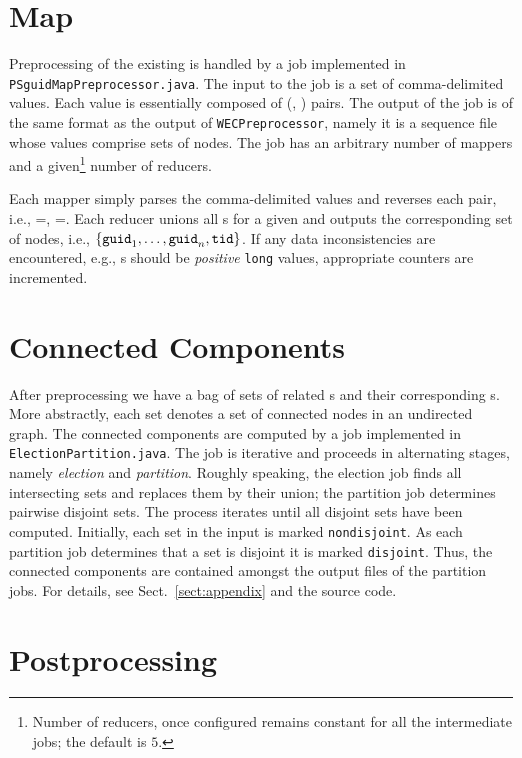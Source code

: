 \documentclass{article}[12pt]
\numberwithin{figure}{section}
\begin{document}
\section{Map}

Preprocessing of the existing {\PSGUIDMAP} is handled by a {\MAPREDUCE} job implemented in \texttt{PSguidMapPreprocessor.java}.
The input to the job is a set of comma-delimited values.  Each value is essentially composed of ({\PSGUID}, {\TID}) pairs.
The output of the job is of the same format as the output of \texttt{WECPreprocessor}, namely it is a
sequence file whose values comprise sets of nodes.
The job has an arbitrary number of mappers and a given\footnote{Number of reducers, once configured remains constant
for all the intermediate jobs; the default is $5$.} number of reducers.

Each mapper simply parses the comma-delimited values and reverses each pair, i.e., \KEY={\TID}, \VALUE={\PSGUID}.
Each reducer unions all {\PSGUID}s for a given {\TID} and outputs the corresponding set of nodes, i.e., $\{\texttt{guid}_1, \ldots, \texttt{guid}_n, \texttt{tid}\}$.
If any data inconsistencies are encountered, e.g., {\TID}s should be \emph{positive} \texttt{long} values, appropriate counters are incremented.

\section{Connected Components}

After preprocessing we have a bag of sets of related {\GUID}s and their corresponding {\TID}s.  More abstractly, each set denotes a set of
connected nodes in an undirected graph.  
The connected components are computed by a {\MAPREDUCE} job implemented in \texttt{ElectionPartition.java}.
The job is iterative and proceeds in alternating stages, namely \emph{election} and \emph{partition}.
Roughly speaking, the election job finds all intersecting sets and replaces them by their union; the partition job
determines pairwise disjoint sets.  The process iterates until all disjoint sets have been computed.
Initially, each set in the input is marked \texttt{nondisjoint}.  As each partition job determines that a set is disjoint
it is marked \texttt{disjoint}.  Thus, the connected components are contained amongst the output files of the partition jobs.
For details, see Sect.~\ref{sect:appendix} and the source code.

\section{Postprocessing}\label{sect:postprocessing}
\end{document}
